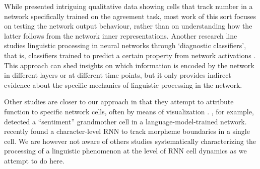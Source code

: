 While  presented intriguing qualitative data
showing cells that track number in a network specifically trained on
the agreement task, most work of this sort focuses on testing the
network output behaviour, rather than on understanding how the latter
follows from the network inner representations. Another research line
studies linguistic processing in neural networks through `diagnostic classifiers', that is, classifiers trained to
predict a certain property from network activations
\cite[e.g.,][]{gelderloos2016phonemes,Adi:etal:2017,alain2017understanding,Hupkes:etal:2017}. This
approach can shed insights on which information is encoded by the
network in different layers or at different time points, but it only
provides indirect evidence about the specific mechanics of linguistic
processing in the network.

Other studies are closer to our approach in that they attempt to
attribute function to specific network cells, often by means of
visualization
\cite{Karpathy:etal:2016,li2016visualizing,tang2017memory}. ,
for example, detected a ``sentiment'' grandmother cell in a
language-model-trained network.  
recently found a character-level RNN to track morpheme boundaries in a
single cell. We are however not aware of others studies systematically
characterizing the processing of a linguistic phenomenon at the level of
RNN cell dynamics as we attempt to do here.



